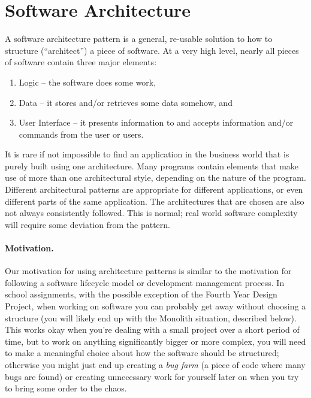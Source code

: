 





\section*{Software Architecture}
A software architecture pattern is a general, re-usable solution to how to structure (``architect'') a piece of software. At a very high level, nearly all pieces of software contain three major elements: 

\begin{enumerate}
	\item Logic -- the software does some work,
	\item Data -- it stores and/or retrieves some data somehow, and
	\item User Interface -- it presents information to and accepts information and/or commands from the user or users.
\end{enumerate}


It is rare if not impossible to find an application in the business world that is purely built using one architecture. Many programs contain elements that make use of more than one architectural style, depending on the nature of the program. Different architectural patterns are appropriate for different applications, or even different parts of the same application. The architectures that are chosen are also not always consistently followed. This is normal; real world software complexity will require some deviation from the pattern. 

\paragraph{Motivation.} Our motivation for using architecture patterns is similar to the motivation for following a software lifecycle model or development management process. In school assignments, with the possible exception of the Fourth Year Design Project, when working on software you can probably get away without choosing a structure (you will likely end up with the Monolith situation, described below). This works okay when you're dealing with a small project over a short period of time, but to work on anything significantly bigger or more complex, you will need to make a meaningful choice about how the software should be structured; otherwise you might just end up creating a \textit{bug farm} (a piece of code where many bugs are found) or creating unnecessary work for yourself later on when you try to bring some order to the chaos.

